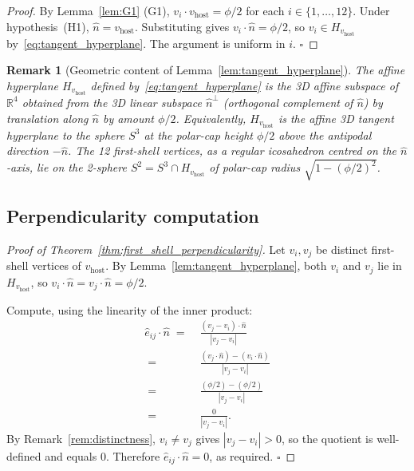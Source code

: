 \documentclass[11pt,letterpaper]{article}
\newtheorem{remark}[theorem]{Remark}
\newcommand{\nhat}{\hat{n}}
\newcommand{\vhost}{v_{\text{host}}}
\newcommand{\Reals}{\mathbb{R}}
\newcommand{\Hperp}{H_{\vhost}}
\begin{document}
\begin{proof}
By Lemma~\ref{lem:G1} (G1), $v_i \cdot \vhost = \phi/2$ for each $i \in \{1, \ldots, 12\}$. Under hypothesis~(H1), $\nhat = \vhost$. Substituting gives $v_i \cdot \nhat = \phi/2$, so $v_i \in \Hperp$ by~\eqref{eq:tangent_hyperplane}. The argument is uniform in $i$. $\square$
\end{proof}

\begin{remark}[Geometric content of Lemma~\ref{lem:tangent_hyperplane}]\label{rem:tangent_hyperplane_geometric}
The affine hyperplane $\Hperp$ defined by~\eqref{eq:tangent_hyperplane} is the 3D affine subspace of $\Reals^4$ obtained from the 3D linear subspace $\nhat^\perp$ (orthogonal complement of $\nhat$) by translation along $\nhat$ by amount $\phi/2$. Equivalently, $\Hperp$ is the affine 3D tangent hyperplane to the sphere $S^3$ at the polar-cap height $\phi/2$ above the antipodal direction $-\nhat$. The 12 first-shell vertices, as a regular icosahedron centred on the $\nhat$-axis, lie on the 2-sphere $S^2 = S^3 \cap \Hperp$ of polar-cap radius $\sqrt{1 - (\phi/2)^2}$.
\end{remark}

\subsection{Perpendicularity computation}\label{sec:perpendicularity_proof}

\begin{proof}[Proof of Theorem~\ref{thm:first_shell_perpendicularity}]
Let $v_i, v_j$ be distinct first-shell vertices of $\vhost$. By Lemma~\ref{lem:tangent_hyperplane}, both $v_i$ and $v_j$ lie in $\Hperp$, so $v_i \cdot \nhat = v_j \cdot \nhat = \phi/2$.

Compute, using the linearity of the inner product:
\begin{align*}
\hat{e}_{ij} \cdot \nhat
\;=\;& \frac{(v_j - v_i) \cdot \nhat}{|v_j - v_i|} \\
\;=\;& \frac{(v_j \cdot \nhat) - (v_i \cdot \nhat)}{|v_j - v_i|} \\
\;=\;& \frac{(\phi/2) - (\phi/2)}{|v_j - v_i|} \\
\;=\;& \frac{0}{|v_j - v_i|}.
\end{align*}
By Remark~\ref{rem:distinctness}, $v_i \neq v_j$ gives $|v_j - v_i| > 0$, so the quotient is well-defined and equals $0$. Therefore $\hat{e}_{ij}\cdot\nhat = 0$, as required. $\square$
\end{proof}
\end{document}
